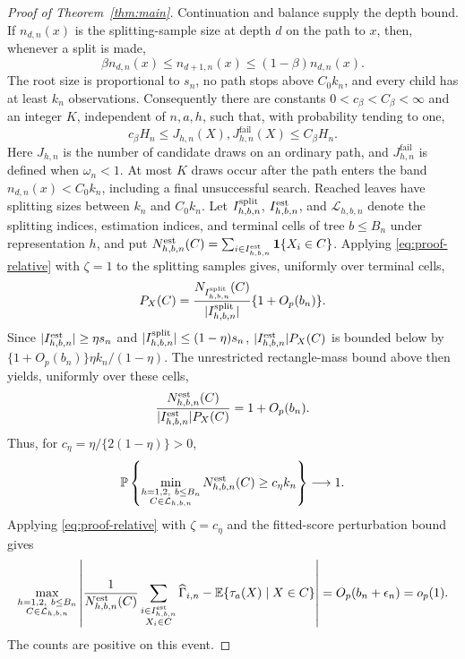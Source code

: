\documentclass[12pt]{article}
\newcommand{\E}{\mathbb E}
\newcommand{\Prb}{\mathbb P}
\newcommand{\one}{\mathbf 1}
\begin{document}
\begin{appendix}
\begin{proof}[Proof of Theorem~\ref{thm:main}]
Continuation and balance supply the depth bound. If \(n_{d,n}(x)\) is the splitting-sample size at depth \(d\) on the path to \(x\), then, whenever a split is made,
\[
\beta n_{d,n}(x)\le n_{d+1,n}(x)\le(1-\beta)n_{d,n}(x).
\]
The root size is proportional to \(s_n\), no path stops above \(C_0k_n\), and every child has at least \(k_n\) observations. Consequently there are constants \(0<c_\beta<C_\beta<\infty\) and an integer \(K\), independent of \(n,a,h\), such that, with probability tending to one,
\begin{equation}\label{eq:proof-depth}
c_\beta H_n\le J_{h,n}(X),J_{h,n}^{\mathrm{fail}}(X)\le C_\beta H_n.
\end{equation}
Here \(J_{h,n}\) is the number of candidate draws on an ordinary path, and \(J_{h,n}^{\mathrm{fail}}\) is defined when \(\omega_n<1\). At most \(K\) draws occur after the path enters the band \(n_{d,n}(x)<C_0k_n\), including a final unsuccessful search. Reached leaves have splitting sizes between \(k_n\) and \(C_0k_n\). Let \(I_{h,b,n}^{\rm split}\), \(I_{h,b,n}^{\rm est}\), and \(\mathcal L_{h,b,n}\) denote the splitting indices, estimation indices, and terminal cells of tree \(b\le B_n\) under representation \(h\), and put \(N_{h,b,n}^{\rm est}(C)=\sum_{i\in I_{h,b,n}^{\rm est}}\one\{X_i\in C\}\). Applying \eqref{eq:proof-relative} with \(\zeta=1\) to the splitting samples gives, uniformly over terminal cells,
\[
P_X(C)=\frac{N_{I_{h,b,n}^{\rm split}}(C)}{|I_{h,b,n}^{\rm split}|}
\{1+O_p(b_n)\}.
\]
Since \(|I_{h,b,n}^{\rm est}|\ge\eta s_n\) and \(|I_{h,b,n}^{\rm split}|\le(1-\eta)s_n\), \(|I_{h,b,n}^{\rm est}|P_X(C)\) is bounded below by \(\{1+O_p(b_n)\}\eta k_n/(1-\eta)\). The unrestricted rectangle-mass bound above then yields, uniformly over these cells,
\[
\frac{N_{h,b,n}^{\rm est}(C)}{|I_{h,b,n}^{\rm est}|P_X(C)}
=1+O_p(b_n).
\]
Thus, for \(c_\eta=\eta/\{2(1-\eta)\}>0\),
\[
\Prb\left\{
\min_{\substack{h=1,2,\ b\le B_n\\C\in\mathcal L_{h,b,n}}}
N_{h,b,n}^{\rm est}(C)\ge c_\eta k_n
\right\}\longrightarrow1.
\]
Applying \eqref{eq:proof-relative} with \(\zeta=c_\eta\) and the fitted-score perturbation bound gives
\begin{equation}\label{eq:proof-leaf}
\max_{\substack{h=1,2,\ b\le B_n\\C\in\mathcal L_{h,b,n}}}\left|
\frac{1}{N_{h,b,n}^{\rm est}(C)}
\sum_{\substack{i\in I_{h,b,n}^{\rm est}\\X_i\in C}}\widehat\Gamma_{i,n}
-\E\{\tau_a(X)\mid X\in C\}
\right|=O_p(b_n+\epsilon_n)=o_p(1).
\end{equation}
The counts are positive on this event.


\end{proof}
\end{appendix}
\end{document}
